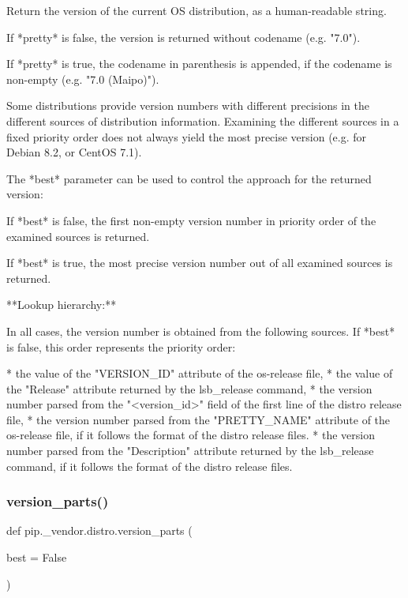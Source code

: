 \begin{DoxyVerb}Return the version of the current OS distribution, as a human-readable
string.

If *pretty* is false, the version is returned without codename (e.g.
"7.0").

If *pretty* is true, the codename in parenthesis is appended, if the
codename is non-empty (e.g. "7.0 (Maipo)").

Some distributions provide version numbers with different precisions in
the different sources of distribution information. Examining the different
sources in a fixed priority order does not always yield the most precise
version (e.g. for Debian 8.2, or CentOS 7.1).

The *best* parameter can be used to control the approach for the returned
version:

If *best* is false, the first non-empty version number in priority order of
the examined sources is returned.

If *best* is true, the most precise version number out of all examined
sources is returned.

**Lookup hierarchy:**

In all cases, the version number is obtained from the following sources.
If *best* is false, this order represents the priority order:

* the value of the "VERSION_ID" attribute of the os-release file,
* the value of the "Release" attribute returned by the lsb_release
  command,
* the version number parsed from the "<version_id>" field of the first line
  of the distro release file,
* the version number parsed from the "PRETTY_NAME" attribute of the
  os-release file, if it follows the format of the distro release files.
* the version number parsed from the "Description" attribute returned by
  the lsb_release command, if it follows the format of the distro release
  files.
\end{DoxyVerb}
 \mbox{\label{namespacepip_1_1__vendor_1_1distro_a6980a60d8a6df99832c5417cc59716b2}} 
\subsubsection{\texorpdfstring{version\+\_\+parts()}{version\_parts()}}
{\footnotesize\ttfamily def pip.\+\_\+vendor.\+distro.\+version\+\_\+parts (\begin{DoxyParamCaption}\item[{}]{best = {\ttfamily False} }\end{DoxyParamCaption})}

